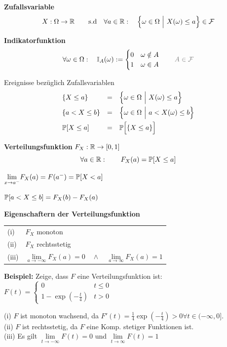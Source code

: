  \textbf{Zufallsvariable}
$$
    X: \Omega \to \R \qquad \text{s.d} \quad \forall a \in \R:\quad \Bigl\{ \omega \in \Omega\ \Big|\ X(\omega)\leq a \Bigr\} \in \F
$$

\footnotesize
{} \textbf{Indikatorfunktion}
$$
    \forall \omega \in \Omega:\quad \mathbb{I}_A(\omega) := \begin{cases}
        0 & \omega \notin A \\
        1 & \omega \in A
    \end{cases}
    \color{gray}
    \qquad A \in \F
    \color{black}
$$
\normalsize

\notation Ereignisse bezüglich Zufallsvariablen
\begin{align*}
    & \{ X \leq a \}      &=\quad& \Bigl\{ \omega \in \Omega \ \Big|\ X(\omega) \leq a \Bigr\} \\
    & \{ a < X \leq b \}  &=\quad& \Bigl\{ \omega \in \Omega \ \Big|\ a < X(\omega) \leq b \Bigr\} \\
    & \P[X \leq a]        &=\quad& \P\Bigl[\{ X \leq a \}\Bigr]
\end{align*}

 \textbf{Verteilungsfunktion} $F_X: \R \to [0,1]$
$$
    \forall a \in \R:\qquad F_X(a) = \P[X \leq a]
$$

{\scriptsize
    \notation $\underset{x \to a^-}{\lim}F_X(a) = F(a^-) = \P[X < a]$

    \lemma $\P[a < X \leq b] = F_X(b) - F_X(a)$
}

\theorem \textbf{Eigenschaftern der Verteilungsfunktion}

\begin{tabular}{ll}
    (i)     & $F_X$ monoton \\
    (ii)    & $F_X$ rechtsstetig \\
    (iii)   & $\underset{a \to -\infty}{\lim} F_X(a) = 0 \quad\land\quad \underset{a \to \infty}{\lim}F_X(a)=1$
\end{tabular}

{\footnotesize
    \textbf{Beispiel:} Zeige, dass $F$ eine Verteilungsfunktion ist:\\
    $F(t) = \begin{cases}
        0 & t \leq 0 \\
        1-\exp(-\frac{t}{4}) & t > 0
    \end{cases}$

    (i) $F$ ist monoton wachsend, da $F'(t) = \frac{1}{4}\exp(-\frac{t}{4}) > 0 \forall t \in (-\infty, 0]$.\\
    (ii) $F$ ist rechtsstetig, da $F$ eine Komp. stetiger Funktionen ist.\\
    (iii) Es gilt $\underset{t\to-\infty}{\lim}F(t)=0$ und $\underset{t\to\infty}{\lim}F(t)=1$
}

